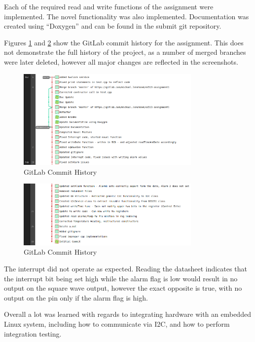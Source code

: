 Each of the required read and write functions of the assignment were implemented.
The novel functionality was also implemented. Documentation was created
using ``Doxygen'' and can be found in the submit git repository.

Figures \ref{fig:images-git1} and \ref{fig:images-git2} show the GitLab commit
history for the assignment. This does not demonstrate the full history of the
project, as a number of merged branches were later deleted, however all major
changes are reflected in the screenshots.

\begin{figure}[H]
	\centering
	\includegraphics[width=0.8\textwidth]{images/git1}
	\caption{GitLab Commit History}
	\label{fig:images-git1}
\end{figure}

\begin{figure}[H]
	\centering
	\includegraphics[width=0.8\textwidth]{images/git2}
	\caption{GitLab Commit History}
	\label{fig:images-git2}
\end{figure}

The interrupt
did not operate as expected. Reading the datasheet indicates that the interrupt
bit being set high while the alarm flag is low would result in no output on the
square wave output, however the exact opposite is true, with no output on the
pin only if the alarm flag is high.

Overall a lot was learned with regards to integrating hardware with an embedded
Linux system, including how to communicate via I2C, and how to perform
integration testing.
